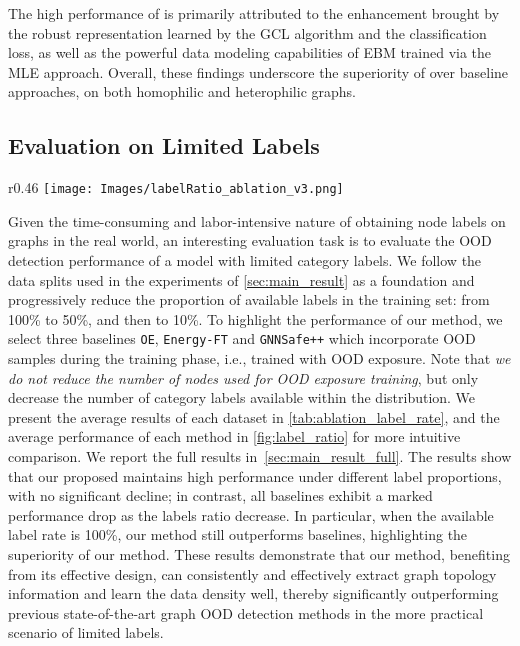 The high performance of \shortname is primarily attributed to the enhancement brought by the robust representation learned by the GCL algorithm and the classification loss, as well as the powerful data modeling capabilities of EBM trained via the MLE approach. 
Overall, these findings underscore the superiority of \shortname over baseline approaches, on both homophilic and heterophilic graphs.




\vspace{-2mm}
\subsection{Evaluation on Limited Labels}
\vspace{-2mm}
\label{sec:limited_labels}

\begin{wrapfigure}[10]{r}{0.46\textwidth}
\vspace{-8.5mm}
  \centering
  \texttt{[image: Images/labelRatio\_ablation\_v3.png]}
  \vspace{-12pt}
  \caption{Performance across labeled ratios.}
  \label{fig:label_ratio}
\end{wrapfigure}

Given the time-consuming and labor-intensive nature of obtaining node labels on graphs in the real world, an interesting evaluation task is to evaluate the OOD detection performance of a model with limited category labels. 
We follow the data splits used in the experiments of \cref{sec:main_result} as a foundation and progressively reduce the proportion of available labels in the training set: from 100\% to 50\%, and then to 10\%. 
To highlight the performance of our method, we select three baselines \texttt{OE}, \texttt{Energy-FT} and \texttt{GNNSafe++} which incorporate OOD samples during the training phase, i.e., trained with OOD exposure. 
Note that \textit{we do not reduce the number of nodes used for OOD exposure training}, but only decrease the number of category labels available within the distribution. 
We present the average results of each dataset in \cref{tab:ablation_label_rate}, and the average performance of each method in \cref{fig:label_ratio} for more intuitive comparison. We report the full results in~\cref{sec:main_result_full}. 
The results show that our proposed \shortname maintains high performance under different label proportions, with no significant decline; in contrast, all baselines exhibit a marked performance drop as the labels ratio decrease. 
In particular, when the available label rate is 100\%, our method still outperforms baselines, highlighting the superiority of our method.
These results demonstrate that our method, benefiting from its effective design, can consistently and effectively extract graph topology information and learn the data density well, thereby significantly outperforming previous state-of-the-art graph OOD detection methods in the more practical scenario of limited labels.


